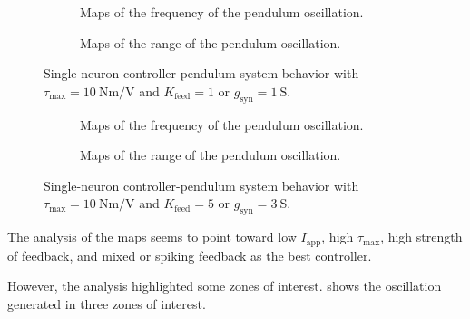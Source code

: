 \begin{figure}[!htbp]
    \centering
    \begin{subfigure}[t][.46\textheight][b]{\textwidth}
        \centering
        \caption{Maps of the frequency of the pendulum oscillation.}
        \label{fig:single_t10_low_freq}
    \end{subfigure}
    
    \begin{subfigure}[b][.46\textheight][t]{\textwidth}
        \centering
        \caption{Maps of the range of the pendulum oscillation.}
        \label{fig:single_t10_low_range}
    \end{subfigure}
    \caption{Single-neuron controller-pendulum system behavior with $\tau_\text{max}=\qty{10}{\newton\meter\per\volt}$ and $K_\text{feed} = 1$ or $g_{\text{syn}} = \qty{1}{\siemens}$.}
    \label{fig:single_t10_low}
\end{figure}

\begin{figure}[!htbp]
    \centering
    \begin{subfigure}[t][.46\textheight][b]{\textwidth}
        \centering
        \caption{Maps of the frequency of the pendulum oscillation.}
        \label{fig:single_t10_high_freq}
    \end{subfigure}
    
    \begin{subfigure}[b][.46\textheight][t]{\textwidth}
        \centering
        \caption{Maps of the range of the pendulum oscillation.}
        \label{fig:single_t10_high_range}
    \end{subfigure}
    \caption{Single-neuron controller-pendulum system behavior with $\tau_\text{max}=\qty{10}{\newton\meter\per\volt}$ and $K_\text{feed} = 5$ or $g_{\text{syn}} = \qty{3}{\siemens}$.}
    \label{fig:single_t10_high}
\end{figure}

The analysis of the maps seems to point toward low $I_\text{app}$, high $\tau_\text{max}$, high strength of feedback, and mixed or spiking feedback as the best controller.

However, the analysis highlighted some zones of interest.
 shows the oscillation generated in three zones of interest.

